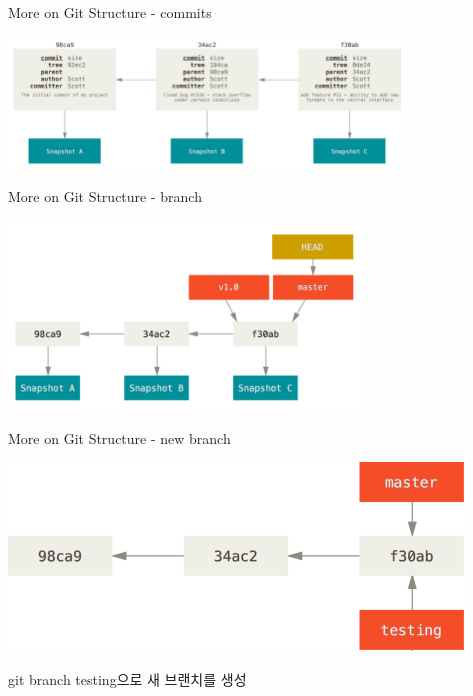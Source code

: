 \documentclass{beamer}
\begin{document}
\begin{frame}{More on Git Structure - commits} 
\begin{center}
\includegraphics[height=3.5cm,keepaspectratio]{commits-and-parents}
\end{center}
\end{frame}

\begin{frame}{More on Git Structure - branch} 
\begin{center}
\includegraphics[height=5cm,keepaspectratio]{branch-and-history}
\end{center}
\end{frame}

\begin{frame}{More on Git Structure - new branch} 
\begin{center}
\includegraphics[height=5cm,keepaspectratio]{two-branches}
\end{center}
git branch testing으로 새 브랜치를 생성
\end{frame}
\end{document}
